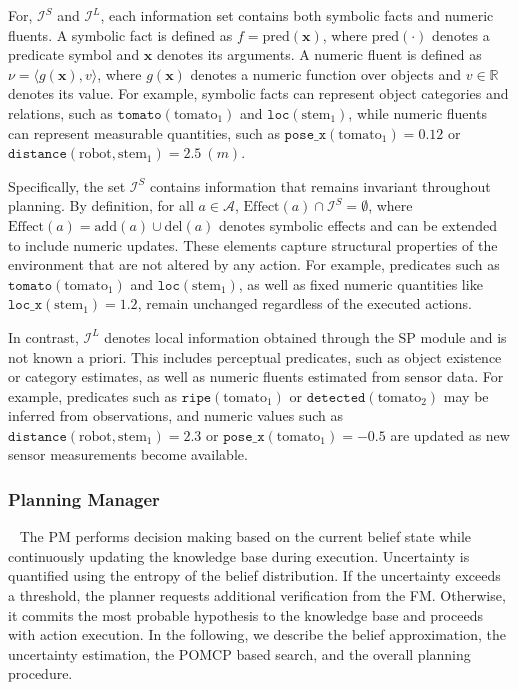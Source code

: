 For, $\mathcal{I}^{S}$ and $\mathcal{I}^{L}$, each information set contains both symbolic facts and numeric fluents. A symbolic fact is defined as $f = \text{pred}(\mathbf{x})$, where $\text{pred}(\cdot)$ denotes a predicate symbol and $\mathbf{x}$ denotes its arguments. A numeric fluent is defined as $\nu = \langle g(\mathbf{x}), v \rangle$, where $g(\mathbf{x})$ denotes a numeric function over objects and $v \in \mathbb{R}$ denotes its value. For example, symbolic facts can represent object categories and relations, such as $\texttt{tomato}(\text{tomato}_1)$ and $\texttt{loc}(\text{stem}_1)$, while numeric fluents can represent measurable quantities, such as $\texttt{pose\_x}(\text{tomato}_1)=0.12$ or $\texttt{distance}(\text{robot}, \text{stem}_1)=2.5\ (m)$.


Specifically, the set $\mathcal{I}^{S}$ contains information that remains invariant throughout planning. By definition, for all $a \in \mathcal{A}$, $\mathrm{Effect}(a) \cap \mathcal{I}^{S} = \emptyset$, where $\mathrm{Effect}(a)=\mathrm{add}(a) \cup \mathrm{del}(a)$ denotes symbolic effects and can be extended to include numeric updates. These elements capture structural properties of the environment that are not altered by any action. For example, predicates such as $\texttt{tomato}(\text{tomato}_1)$ and $\texttt{loc}(\text{stem}_1)$, as well as fixed numeric quantities like $\texttt{loc\_x}(\text{stem}_1)=1.2$, remain unchanged regardless of the executed actions.


In contrast, $\mathcal{I}^{L}$ denotes local information obtained through the SP module and is not known a priori. This includes perceptual predicates, such as object existence or category estimates, as well as numeric fluents estimated from sensor data. For example, predicates such as $\texttt{ripe}(\text{tomato}_1)$ or $\texttt{detected}(\text{tomato}_2)$ may be inferred from observations, and numeric values such as $\texttt{distance}(\text{robot}, \text{stem}_1)=2.3$ or $\texttt{pose\_x}(\text{tomato}_1)=-0.5$ are updated as new sensor measurements become available.



\subsubsection{Planning Manager}~\label{method:PM}
The PM performs decision making based on the current belief state while continuously updating the knowledge base during execution. Uncertainty is quantified using the entropy of the belief distribution. If the uncertainty exceeds a threshold, the planner requests additional verification from the FM. Otherwise, it commits the most probable hypothesis to the knowledge base and proceeds with action execution. In the following, we describe the belief approximation, the uncertainty estimation, the POMCP based search, and the overall planning procedure.


